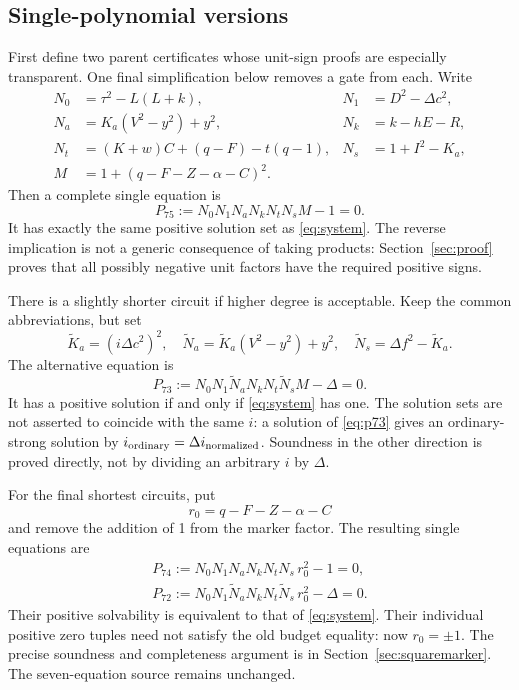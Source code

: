 \documentclass[11pt,a4paper]{article}
\theoremstyle{definition}\newtheorem{definition}[theorem]{Definition}
\begin{document}
\subsection{Single-polynomial versions}
First define two parent certificates whose unit-sign proofs are especially
transparent. One final simplification below removes a gate from each.
Write
\begin{align*}
 N_0&=\tau^2-L(L+k),&N_1&=D^2-\Delta c^2,\\
 N_a&=K_a(V^2-y^2)+y^2,&N_k&=k-hE-R,\\
 N_t&=(K+w)C+(q-F)-t(q-1),&N_s&=1+I^2-K_a,\\
 M&=1+(q-F-Z-\alpha-C)^2.
\end{align*}
Then a complete single equation is
\begin{equation}\label{eq:p75}
 \boxed{P_{75}:=N_0N_1N_aN_kN_tN_sM-1=0.}
\end{equation}
It has exactly the same positive solution set as
\eqref{eq:system}. The reverse implication is not a generic consequence
of taking products: Section~\ref{sec:proof} proves that all possibly
negative unit factors have the required positive signs.

There is a slightly shorter circuit if higher degree is acceptable.
Keep the common abbreviations, but set
\[
 \widetilde K_a=(i\Delta c^2)^2,\quad
 \widetilde N_a=\widetilde K_a(V^2-y^2)+y^2,\quad
 \widetilde N_s=\Delta f^2-\widetilde K_a.
\]
The alternative equation is
\begin{equation}\label{eq:p73}
 \boxed{P_{73}:=
 N_0N_1\widetilde N_aN_kN_t\widetilde N_sM-\Delta=0.}
\end{equation}
It has a positive solution if and only if \eqref{eq:system} has one.
The solution sets are not asserted to coincide with the same $i$:
a solution of \eqref{eq:p73} gives an ordinary-strong solution by
$i_{\rm ordinary}=\Delta i_{\rm normalized}$. Soundness in the other
direction is proved directly, not by dividing an arbitrary $i$ by
$\Delta$.

For the final shortest circuits, put
\[
 r_0=q-F-Z-\alpha-C
\]
and remove the addition of 1 from the marker factor. The resulting
single equations are
\begin{align}
 \boxed{P_{74}:=N_0N_1N_aN_kN_tN_s\,r_0^2-1=0,}
 \label{eq:p74}\\
 \boxed{P_{72}:=N_0N_1\widetilde N_aN_kN_t\widetilde N_s\,r_0^2-\Delta=0.}
 \label{eq:p72}
\end{align}
Their positive solvability is equivalent to that of
\eqref{eq:system}. Their individual positive zero tuples need not
satisfy the old budget equality: now $r_0=\pm1$. The precise
soundness and completeness argument is in
Section~\ref{sec:squaremarker}. The seven-equation source remains
unchanged.
\end{document}
